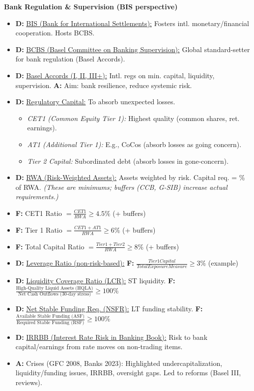 \documentclass[7pt,landscape]{extarticle} %
\newcommand{\cheatsheetsubsubsection}[1]{%
  \vspace{0.15ex plus 0.05ex minus 0.05ex}%
  \noindent\textbf{\sffamily\scriptsize #1}%
  \par\vspace{0.05ex}%
}
\newcommand{\D}[1]{\textbf{\textcolor{DefColor}{D:}} \uline{#1}}
\newcommand{\F}[1]{\textbf{\textcolor{FormColor}{F:}} #1}
\newcommand{\A}[1]{\textbf{\textcolor{AppColor}{A:}} #1}
\newcommand{\SF}[1]{\textit{\small (#1)}} %
\begin{document}
\begin{multicols*}{4}
  \cheatsheetsubsubsection{Bank Regulation \& Supervision (BIS perspective)}
  \begin{itemize}
    \item \D{BIS (Bank for International Settlements):} Fosters intl. monetary/financial cooperation. Hosts BCBS.
    \item \D{BCBS (Basel Committee on Banking Supervision):} Global standard-setter for bank regulation (Basel Accords).
    \item \D{Basel Accords (I, II, III+):} Intl. regs on min. capital, liquidity, supervision. \A{Aim: bank resilience, reduce systemic risk.}
    \item \D{Regulatory Capital:} To absorb unexpected losses.
          \begin{itemize}
            \item \emph{CET1 (Common Equity Tier 1):} Highest quality (common shares, ret. earnings).
            \item \emph{AT1 (Additional Tier 1):} E.g., CoCos (absorb losses as going concern).
            \item \emph{Tier 2 Capital:} Subordinated debt (absorb losses in gone-concern).
          \end{itemize}
    \item \D{RWA (Risk-Weighted Assets):} Assets weighted by risk. Capital req. = \% of RWA.
          \SF{These are minimums; buffers (CCB, G-SIB) increase actual requirements.}
    \item \F{CET1 Ratio $= \frac{CET1}{RWA} \ge 4.5\% $ (+ buffers)}
    \item \F{Tier 1 Ratio $= \frac{CET1+AT1}{RWA} \ge 6\% $ (+ buffers)}
    \item \F{Total Capital Ratio $= \frac{Tier1+Tier2}{RWA} \ge 8\% $ (+ buffers)}
    \item \D{Leverage Ratio (non-risk-based):} \F{$\frac{Tier 1 Capital}{Total Exposure Measure} \ge 3\%$ (example)}
    \item \D{Liquidity Coverage Ratio (LCR):} ST liquidity. \F{$\frac{\text{High-Quality Liquid Assets (HQLA)}}{\text{Net Cash Outflows (30-day stress)}} \ge 100\%$}
    \item \D{Net Stable Funding Req. (NSFR):} LT funding stability. \F{$\frac{\text{Available Stable Funding (ASF)}}{\text{Required Stable Funding (RSF)}} \ge 100\%$}
    \item \D{IRRBB (Interest Rate Risk in Banking Book):} Risk to bank capital/earnings from rate moves on non-trading items.
    \item \A{Crises (GFC 2008, Banks 2023): Highlighted undercapitalization, liquidity/funding issues, IRRBB, oversight gaps. Led to reforms (Basel III, reviews).}
  \end{itemize}
  

\end{multicols*}
\end{document}
